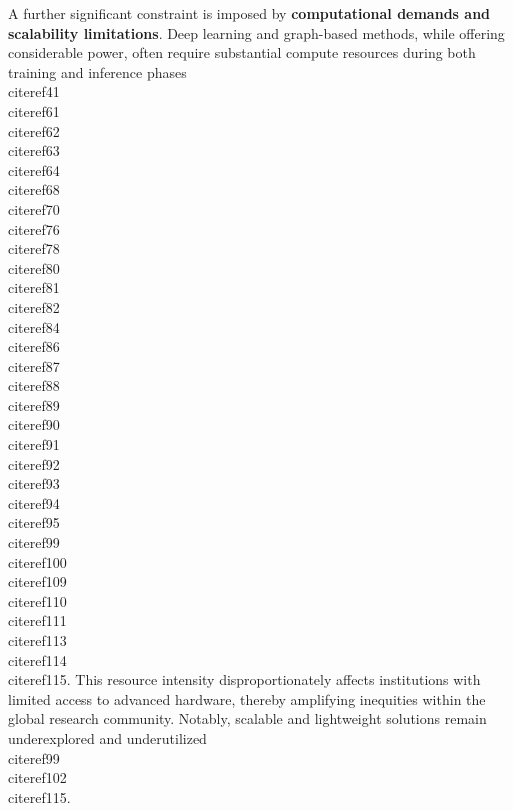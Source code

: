 \documentclass[11pt]{article}
\begin{document}
A further significant constraint is imposed by \textbf{computational demands and scalability limitations}. Deep learning and graph-based methods, while offering considerable power, often require substantial compute resources during both training and inference phases \\cite{ref41}\\cite{ref61}\\cite{ref62}\\cite{ref63}\\cite{ref64}\\cite{ref68}\\cite{ref70}\\cite{ref76}\\cite{ref78}\\cite{ref80}\\cite{ref81}\\cite{ref82}\\cite{ref84}\\cite{ref86}\\cite{ref87}\\cite{ref88}\\cite{ref89}\\cite{ref90}\\cite{ref91}\\cite{ref92}\\cite{ref93}\\cite{ref94}\\cite{ref95}\\cite{ref99}\\cite{ref100}\\cite{ref109}\\cite{ref110}\\cite{ref111}\\cite{ref113}\\cite{ref114}\\cite{ref115}. This resource intensity disproportionately affects institutions with limited access to advanced hardware, thereby amplifying inequities within the global research community. Notably, scalable and lightweight solutions remain underexplored and underutilized \\cite{ref99}\\cite{ref102}\\cite{ref115}.
\end{document}
